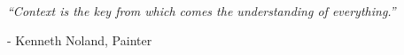 \vspace*{\fill}


\begingroup
  \\
  {\it
  	``Context is the key from which comes the understanding of everything.''
  }
  \begin{flushright}
    - Kenneth Noland, Painter
  \end{flushright}
\endgroup


\vspace*{\fill}
